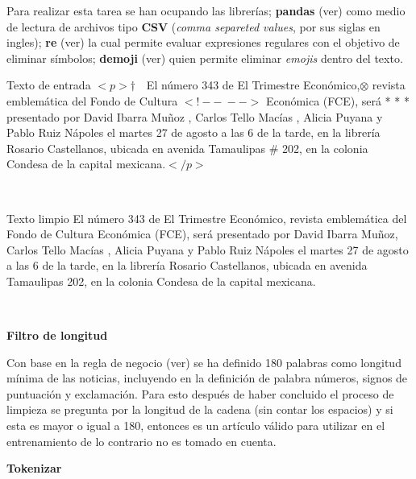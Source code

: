 Para realizar esta tarea se han ocupando las librerías; \textbf{pandas} (ver) como medio de lectura de archivos tipo \textbf{CSV} (\textit{comma separeted values}, por sus siglas en ingles); \textbf{re} (ver) la cual permite evaluar expresiones regulares con el objetivo de eliminar símbolos; \textbf{demoji} (ver) quien permite eliminar \textit{emojis} dentro del texto.\\

\begin{mygraybox}[label={box:cp5:texto}]{Texto de entrada} 
$<p>\dagger$$\ \ \ $ El número 343 de El Trimestre Económico,$\otimes$ revista emblemática del Fondo de Cultura 
$<!--\ -->$
Económica (FCE), será * * * presentado por David Ibarra Muñoz \dSmiley , Carlos Tello Macías \dCooley , Alicia Puyana \dInnocey y Pablo Ruiz Nápoles el martes 27 de agosto a las 6 de la tarde, en la librería Rosario Castellanos, ubicada en avenida Tamaulipas \# 202, en la colonia Condesa de la capital mexicana.$</p>$
\end{mygraybox}

\ \\

\begin{mygraybox}[label={box:cp5:limpio}]{Texto limpio} 
El número 343 de El Trimestre Económico, revista emblemática del Fondo de Cultura 
Económica (FCE), será presentado por David Ibarra Muñoz, Carlos Tello Macías , Alicia Puyana y Pablo Ruiz Nápoles el martes 27 de agosto a las 6 de la tarde, en la librería Rosario Castellanos, ubicada en avenida Tamaulipas 202, en la colonia Condesa de la capital mexicana.
\end{mygraybox}
\ \\

\begin{large}
\textbf{Filtro de longitud}\\
\end{large}

Con base en la regla de negocio (ver) se ha definido 180 palabras como longitud mínima de las noticias, incluyendo en la definición de palabra números, signos de puntuación y exclamación.
Para esto después de haber concluido el proceso de limpieza se pregunta por la longitud de la cadena (sin contar los espacios) y si esta es mayor o igual a 180, entonces es un artículo válido para utilizar en el entrenamiento de lo contrario no es tomado en cuenta.\\

\begin{large}
\textbf{Tokenizar}\\
\end{large}

